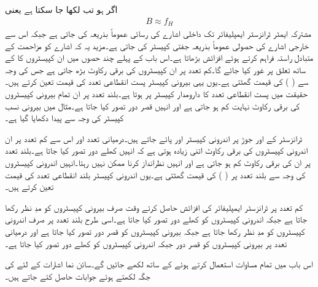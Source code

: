 اگر  ہو تب  لکھا جا سکتا ہے یعنی
\begin{align} \label{مساوات_تعددی_ردعمل_دائرہ_کارکردگی_الف}
B \approx f_H
\end{align}
مشترکہ ایمٹر ٹرانزسٹر ایمپلیفائر تک داخلی اشارے کی رسائی عموماً بذریعہ   کی جاتی ہے جبکہ اس سے خارجی اشارے کی حصولی عموماً بذریعہ جفتی کپیسٹر   کی جاتی ہے۔مزید یہ کہ    اشارے کو مزاحمت  کے متبادل راستہ فراہم کرتے ہوئے افزائش بڑھاتا ہے۔اس باب کے پہلے چند حصوں میں ان کپیسٹروں کا  کے ساتھ تعلق پر غور کیا جائے گا۔کم تعدد پر ان کپیسٹروں کی برقی رکاوٹ بڑھ جاتی ہے جس کی وجہ سے  (  )  کی قیمت گھٹتی ہے۔یوں یہی بیرونی کپیسٹر پست انقطاعی تعدد  کی قیمت  تعین کرتے ہیں۔حقیقت میں پست انقطاعی تعدد  کا دارومدار کپیسٹر  پر ہوتا ہے۔بلند تعدد پر ان تمام بیرونی کپیسٹروں کی برقی رکاوٹ نہایت کم ہو جاتی ہے اور انہیں قصر دور تصور کیا جاتا ہے۔مثال  میں بیرونی نسب کپیسٹر کی وجہ سے پیدا  دکھایا گیا ہے۔

ٹرانزسٹر کے   اور  جوڑ پر اندرونی کپیسٹر  اور  پائے جاتے ہیں۔درمیانی تعدد اور اس سے کم تعدد پر ان اندرونی کپیسٹروں کی برقی رکاوٹ اتنی زیادہ ہوتی ہے کہ انہیں کھلے دور تصور کیا جاتا ہے۔بلند تعدد پر ان کی برقی رکاوٹ کم ہو جاتی ہے اور انہیں نظرانداز کرنا ممکن نہیں رہتا۔انہیں اندرونی کپیسٹروں کی وجہ سے بلند تعدد پر  ( )  کی قیمت گھٹتی ہے۔یوں اندرونی کپیسٹر بلند انقطاعی تعدد  کی قیمت تعین کرتے ہیں۔

کم تعدد پر ٹرانزسٹر ایمپلیفائر کی افزائش حاصل کرتے وقت صرف بیرونی کپیسٹروں کو مدِ نظر رکھا جاتا ہے جبکہ اندرونی کپیسٹروں کو کھلے دور تصور کیا جاتا ہے۔اسی طرح بلند تعدد پر صرف اندرونی کپیسٹروں کو مدِ نظر رکھا جاتا ہے جبکہ بیرونی کپیسٹروں کو قصر دور تصور کیا جاتا ہے اور درمیانی تعدد پر بیرونی کپیسٹروں کو قصر دور جبکہ اندرونی کپیسٹروں کو کھلے دور تصور کیا جاتا ہے۔

اس باب میں تمام مساوات   استعمال کرتے ہوئے  کے ساتھ لکھے جائیں گے۔سائن نما اشارات کے لئے   کی جگہ  لکھتے ہوئے جوابات حاصل کئے جاتے ہیں۔
	
